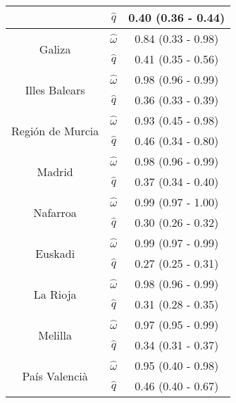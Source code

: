 \documentclass{bmcart}
\begin{document}
\begin{backmatter}
\begin{table}[h]
\begin{tabular}{ccc}
                                & $\hat{q}$       & 0.40 (0.36 - 0.44) \\
\hline
\multirow{2}{*}{Galiza}     & $\hat{\omega}$  & 0.84 (0.33 - 0.98) \\
                            & $\hat{q}$       & 0.41 (0.35 - 0.56) \\
\hline
\multirow{2}{*}{Illes Balears}    & $\hat{\omega}$  & 0.98 (0.96 - 0.99) \\
                                  & $\hat{q}$       & 0.36 (0.33 - 0.39) \\
\hline
\multirow{2}{*}{Regi\'on de Murcia}    & $\hat{\omega}$  & 0.93 (0.45 - 0.98) \\
                                       & $\hat{q}$       & 0.46 (0.34 - 0.80) \\
\hline
\multirow{2}{*}{Madrid}      & $\hat{\omega}$  & 0.98 (0.96 - 0.99) \\
                             & $\hat{q}$       & 0.37 (0.34 - 0.40) \\
\hline
\multirow{2}{*}{Nafarroa}    & $\hat{\omega}$  & 0.99 (0.97 - 1.00) \\
                             & $\hat{q}$       & 0.30 (0.26 - 0.32)\\
\hline
\multirow{2}{*}{Euskadi}    & $\hat{\omega}$  & 0.99 (0.97 - 0.99) \\
                            & $\hat{q}$       & 0.27 (0.25 - 0.31) \\
\hline
\multirow{2}{*}{La Rioja}    & $\hat{\omega}$  & 0.98 (0.96 - 0.99) \\
                             & $\hat{q}$       & 0.31 (0.28 - 0.35) \\
\hline
\multirow{2}{*}{Melilla}    & $\hat{\omega}$  & 0.97 (0.95 - 0.99) \\
                            & $\hat{q}$       & 0.34 (0.31 - 0.37) \\
\hline
\multirow{2}{*}{Pa\'is Valenci\`a}    & $\hat{\omega}$  & 0.95 (0.40 - 0.98) \\
                                      & $\hat{q}$       & 0.46 (0.40 - 0.67) \\
\hline
\end{tabular}
\end{table}


\end{backmatter}
\end{document}
